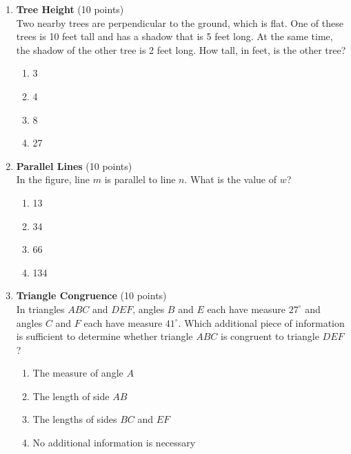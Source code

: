 \begin{enumerate}
  \item \textbf{Tree Height} (10 points)\\
  Two nearby trees are perpendicular to the ground, which is flat. One of these trees is 10 feet tall and has a shadow that is 5 feet long. At the same time, the shadow of the other tree is 2 feet long. How tall, in feet, is the other tree?\\
  \begin{enumerate}[label=(\Alph*)]
    \item 3
    \item 4
    \item 8
    \item 27
  \end{enumerate}
  \begin{subanswer}
  \end{subanswer}

  \newpage

  \item \textbf{Parallel Lines} (10 points)\\
  In the figure, line $m$ is parallel to line $n$. What is the value of $w$?\\
  \begin{enumerate}[label=(\Alph*)]
    \item 13
    \item 34
    \item 66
    \item 134
  \end{enumerate}
  \begin{subanswer}
  \end{subanswer}

  \item \textbf{Triangle Congruence} (10 points)\\
  In triangles $A B C$ and $D E F$, angles $B$ and $E$ each have measure $27^{\circ}$ and angles $C$ and $F$ each have measure $41^{\circ}$. Which additional piece of information is sufficient to determine whether triangle $A B C$ is congruent to triangle $D E F$?\\
  \begin{enumerate}[label=(\Alph*)]
    \item The measure of angle $A$
    \item The length of side $A B$
    \item The lengths of sides $B C$ and $E F$
    \item No additional information is necessary
  \end{enumerate}
  \begin{subanswer}
  \end{subanswer}


\end{enumerate}
